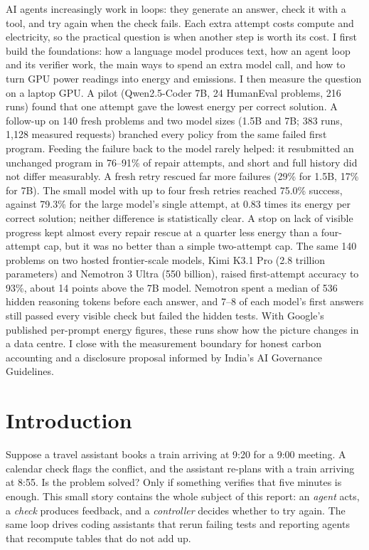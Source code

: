 \documentclass[11pt,a4paper]{article}
\begin{document}
\begin{titlepage}
\begin{tcolorbox}[enhanced,colback=boxbg,colframe=boxbg,arc=0pt,left=14pt,right=14pt,top=10pt,bottom=10pt,width=\textwidth]
AI agents increasingly work in loops: they generate an answer, check it with a tool, and try again when the check fails. Each extra attempt costs compute and electricity, so the practical question is when another step is worth its cost. I first build the foundations: how a language model produces text, how an agent loop and its verifier work, the main ways to spend an extra model call, and how to turn GPU power readings into energy and emissions. I then measure the question on a laptop GPU. A pilot (Qwen2.5-Coder 7B, 24 HumanEval problems, 216 runs) found that one attempt gave the lowest energy per correct solution. A follow-up on 140 fresh problems and two model sizes (1.5B and 7B; 383 runs, 1{,}128 measured requests) branched every policy from the same failed first program. Feeding the failure back to the model rarely helped: it resubmitted an unchanged program in 76--91\% of repair attempts, and short and full history did not differ measurably. A fresh retry rescued far more failures (29\% for 1.5B, 17\% for 7B). The small model with up to four fresh retries reached 75.0\% success, against 79.3\% for the large model's single attempt, at 0.83 times its energy per correct solution; neither difference is statistically clear. A stop on lack of visible progress kept almost every repair rescue at a quarter less energy than a four-attempt cap, but it was no better than a simple two-attempt cap. The same 140 problems on two hosted frontier-scale models, Kimi K3.1 Pro (2.8 trillion parameters) and Nemotron 3 Ultra (550 billion), raised first-attempt accuracy to 93\%, about 14 points above the 7B model. Nemotron spent a median of 536 hidden reasoning tokens before each answer, and 7--8 of each model's first answers still passed every visible check but failed the hidden tests. With Google's published per-prompt energy figures, these runs show how the picture changes in a data centre. I close with the measurement boundary for honest carbon accounting and a disclosure proposal informed by India's AI Governance Guidelines.
\end{tcolorbox}
\end{titlepage}

\begingroup\linespread{1.08}\selectfont
\tableofcontents
\endgroup
\clearpage
{}

\section{Introduction}
Suppose a travel assistant books a train arriving at 9:20 for a 9:00 meeting. A calendar check flags the conflict, and the assistant re-plans with a train arriving at 8:55. Is the problem solved? Only if something verifies that five minutes is enough. This small story contains the whole subject of this report: an \emph{agent} acts, a \emph{check} produces feedback, and a \emph{controller} decides whether to try again. The same loop drives coding assistants that rerun failing tests and reporting agents that recompute tables that do not add up.
\end{document}

